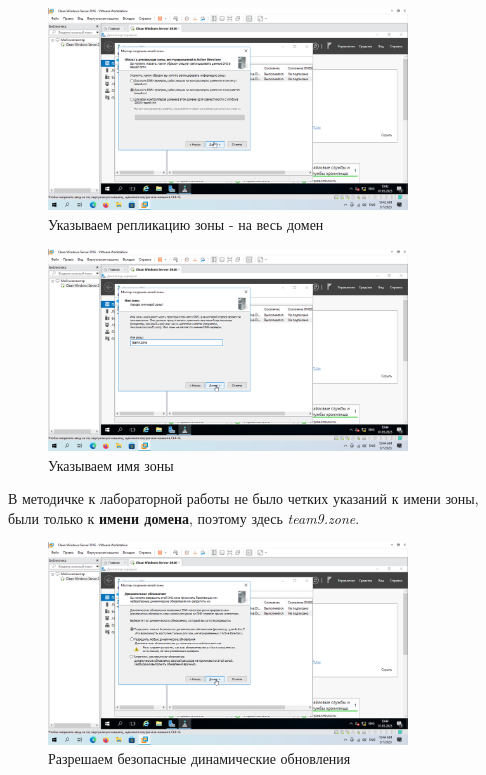 \documentclass[a4paper]{article}
\begin{document}
  \begin{figure}[H]
    \centering
    \includegraphics[width=0.85\textwidth]{9_0069}
    \caption{Указываем репликацию зоны - на весь домен}
    \label{img:0069}
  \end{figure}

  \begin{figure}[H]
    \centering
    \includegraphics[width=0.85\textwidth]{9_0073}
    \caption{Указываем имя зоны}
    \label{img:0073}
  \end{figure}

  В методичке к лабораторной работы не было четких указаний к имени зоны, были
  только к \textbf{имени домена}, поэтому здесь \textit{team9.zone}.

  \begin{figure}[H]
    \centering
    \includegraphics[width=0.85\textwidth]{9_0074}
    \caption{Разрешаем безопасные динамические обновления}
    \label{img:0074}
  \end{figure}
\end{document}
